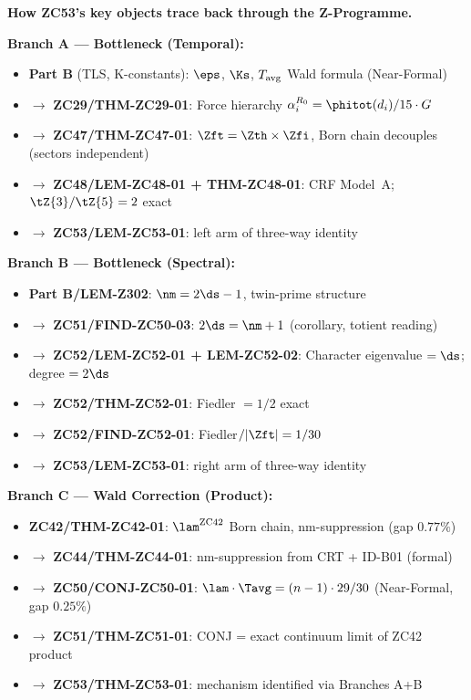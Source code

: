 \documentclass[12pt, a4paper]{article}
\begin{document}
\begin{genealogybox}
\textbf{How ZC53's key objects trace back through the Z-Programme.}

\medskip
\textbf{Branch A — Bottleneck (Temporal):}
\begin{itemize}[leftmargin=2em, noitemsep]
\item \textbf{Part B} (TLS, K-constants): $\eps$, $\Ks$, $T_{\rm avg}$
  Wald formula (Near-Formal)
\item $\to$ \textbf{ZC29/THM-ZC29-01}: Force hierarchy
  $\alpha_i^{R_0} = \phitot(d_i)/15\cdot G$
\item $\to$ \textbf{ZC47/THM-ZC47-01}: $\Zft = \Zth\times\Zfi$,
  Born chain decouples (sectors independent)
\item $\to$ \textbf{ZC48/LEM-ZC48-01 + THM-ZC48-01}:
  CRF Model~A; $\tZ{3}/\tZ{5} = 2$ exact
\item $\to$ \textbf{ZC53/LEM-ZC53-01}: left arm of three-way identity
\end{itemize}

\medskip
\textbf{Branch B — Bottleneck (Spectral):}
\begin{itemize}[leftmargin=2em, noitemsep]
\item \textbf{Part B/LEM-Z302}: $\nm = 2\ds-1$, twin-prime structure
\item $\to$ \textbf{ZC51/FIND-ZC50-03}: $2\ds = \nm+1$ (corollary,
  totient reading)
\item $\to$ \textbf{ZC52/LEM-ZC52-01 + LEM-ZC52-02}:
  Character eigenvalue $= \ds$; degree $= 2\ds$
\item $\to$ \textbf{ZC52/THM-ZC52-01}: Fiedler $= 1/2$ exact
\item $\to$ \textbf{ZC52/FIND-ZC52-01}: Fiedler$/|\Zft| = 1/30$
\item $\to$ \textbf{ZC53/LEM-ZC53-01}: right arm of three-way identity
\end{itemize}

\medskip
\textbf{Branch C — Wald Correction (Product):}
\begin{itemize}[leftmargin=2em, noitemsep]
\item \textbf{ZC42/THM-ZC42-01}: $\lam^{\rm ZC42}$ Born chain,
  nm-suppression (gap $0.77\%$)
\item $\to$ \textbf{ZC44/THM-ZC44-01}: nm-suppression from CRT + ID-B01
  (formal)
\item $\to$ \textbf{ZC50/CONJ-ZC50-01}: $\lam\cdot\Tavg = (n-1)\cdot29/30$
  (Near-Formal, gap $0.25\%$)
\item $\to$ \textbf{ZC51/THM-ZC51-01}: CONJ = exact continuum limit
  of ZC42 product
\item $\to$ \textbf{ZC53/THM-ZC53-01}: mechanism identified via
  Branches A+B
\end{itemize}


\end{genealogybox}
\end{document}
